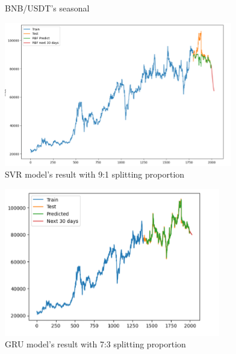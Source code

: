\documentclass{ieeeojies}
\begin{document}
\begin{figure}[H]
\begin{minipage}{0.23\textwidth}
    \caption{BNB/USDT's seasonal}
    \label{fig:enter-label}
    \end{minipage}
\end{figure}

\begin{figure}[H]
  \centering
  \begin{minipage}{0.8\linewidth}
    \centering
    \includegraphics[width=\linewidth]{bibliography/SVR_VCB91.png}
    \caption{SVR model's result with 9:1 splitting proportion}
    \label{fig9}
  \end{minipage}
\end{figure}
\begin{figure}[H]
  \centering
  \begin{minipage}{0.8\linewidth}
    \centering
    \includegraphics[width=\linewidth]{bibliography/GRU_VCB73.png}
    \caption{GRU model's result with 7:3 splitting proportion}
    \label{fig10}
  \end{minipage}
\end{figure}
\end{document}
